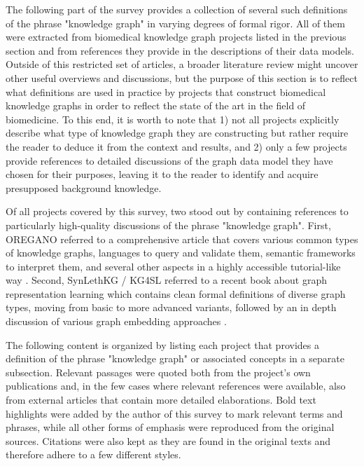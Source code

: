\documentclass{article}
\begin{document}
The following part of the survey provides a collection of several such definitions of the phrase "knowledge graph" in varying degrees of formal rigor. All of them were extracted from biomedical knowledge graph projects listed in the previous section and from references they provide in the descriptions of their data models. Outside of this restricted set of articles, a broader literature review might uncover other useful overviews and discussions, but the purpose of this section is to reflect what definitions are used in practice by projects that construct biomedical knowledge graphs in order to reflect the state of the art in the field of biomedicine. To this end, it is worth to note that 1) not all projects explicitly describe what type of knowledge graph they are constructing but rather require the reader to deduce it from the context and results, and 2) only a few projects provide references to detailed discussions of the graph data model they have chosen for their purposes, leaving it to the reader to identify and acquire presupposed background knowledge.

Of all projects covered by this survey, two stood out by containing references to particularly high-quality discussions of the phrase "knowledge graph". First, OREGANO \cite{oregano_publication2} referred to a comprehensive article that covers various common types of knowledge graphs, languages to query and validate them, semantic frameworks to interpret them, and several other aspects in a highly accessible tutorial-like way \cite{hogan2021}. Second, SynLethKG / KG4SL \cite{kg4sl_publication1} referred to a recent book about graph representation learning which contains clean formal definitions of diverse graph types, moving from basic to more advanced variants, followed by an in depth discussion of various graph embedding approaches \cite{hamilton2020}.

The following content is organized by listing each project that provides a definition of the phrase "knowledge graph" or associated concepts in a separate subsection. Relevant passages were quoted both from the project's own publications and, in the few cases where relevant references were available, also from external articles that contain more detailed elaborations. Bold text highlights were added by the author of this survey to mark relevant terms and phrases, while all other forms of emphasis were reproduced from the original sources. Citations were also kept as they are found in the original texts and therefore adhere to a few different styles.
\end{document}
